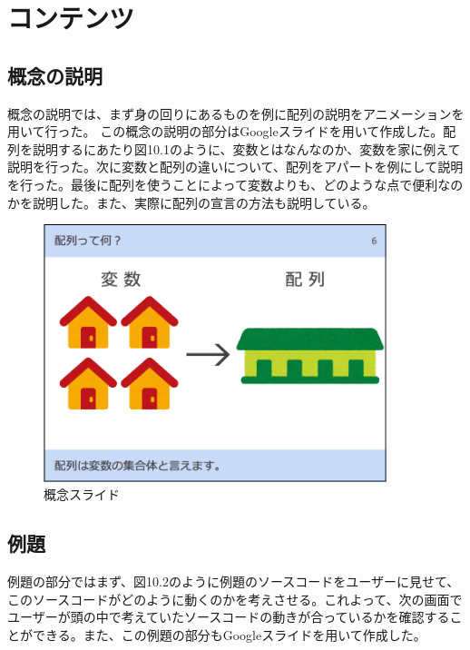 \documentclass[openany,11pt,papersize]{jsbook}
\begin{document}
\section{コンテンツ}

\subsection{概念の説明}
概念の説明では、まず身の回りにあるものを例に配列の説明をアニメーションを用いて行った。
この概念の説明の部分はGoogleスライドを用いて作成した。配列を説明するにあたり図10.1のように、変数とはなんなのか、変数を家に例えて説明を行った。次に変数と配列の違いについて、配列をアパートを例にして説明を行った。最後に配列を使うことによって変数よりも、どのような点で便利なのかを説明した。また、実際に配列の宣言の方法も説明している。
\begin{figure}[H]
\begin{center}
\includegraphics[width=10cm, bb=0 0 850 638]{img/9thParagraph/gainen_01.png}
\end{center}
\caption{概念スライド}
\end{figure}


\subsection{例題}
例題の部分ではまず、図10.2のように例題のソースコードをユーザーに見せて、このソースコードがどのように動くのかを考えさせる。これよって、次の画面でユーザーが頭の中で考えていたソースコードの動きが合っているかを確認することができる。また、この例題の部分もGoogleスライドを用いて作成した。
\end{document}
